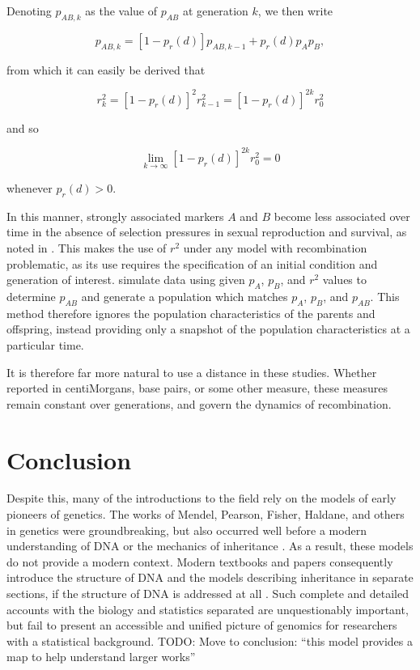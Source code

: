 \documentclass{article}
\newcommand{\TODO}[1]{{\color{brickred} TODO:  {#1}}}
\begin{document}
Denoting $p_{AB,k}$ as the value of $p_{AB}$ at generation $k$, we then write

$$p_{AB,k} = [1 - p_r(d)] p_{AB,k-1} + p_r(d) p_A p_B,$$

\noindent from which it can easily be derived that

$$r^2_k = \left [ 1 - p_r(d) \right ]^2 r^2_{k-1} =  \left [ 1 - p_r(d) \right ]^{2k} r^2_0$$

\noindent and so

$$\lim_{k \rightarrow \infty} \left [ 1 - p_r(d) \right ]^{2k} r^2_0 = 0$$

\noindent whenever $p_r(d) > 0$.

In this manner, strongly associated markers $A$ and $B$ become less associated over time in the absence of selection pressures in sexual reproduction and survival, as noted in \cite{siegmundyakir2007}. This makes the use of $r^2$ under any model with recombination problematic, as its use requires the specification of an initial condition and generation of interest. \cite{LiJi2005} simulate data using given $p_A$, $p_B$, and $r^2$ values to determine $p_{AB}$ and generate a population which matches $p_A$, $p_B$, and $p_{AB}$. This method therefore ignores the population characteristics of the parents and offspring, instead providing only a snapshot of the population characteristics at a particular time.

It is therefore far more natural to use a distance in these studies. Whether reported in centiMorgans, base pairs, or some other measure, these measures remain constant over generations, and govern the dynamics of recombination.

\section{Conclusion} \label{sec:conclusion}

Despite this, many of the introductions to the field rely on the models of early pioneers of genetics. The works of Mendel, Pearson, Fisher, Haldane, and others in genetics were groundbreaking, but also occurred well before a modern understanding of DNA or the mechanics of inheritance \cite{visschergoddard2019}. As a result, these models do not provide a modern context. Modern textbooks and papers consequently introduce the structure of DNA and the models describing inheritance in separate sections, if the structure of DNA is addressed at all \cite{crowkimura1970intro, siegmundyakir2007, xu2013principles, liu1998statistical}. Such complete and detailed accounts with the biology and statistics separated are unquestionably important, but fail to present an accessible and unified picture of genomics for researchers with a statistical background. \TODO{Move to conclusion: ``this model provides a map to help understand larger works''}
\end{document}
